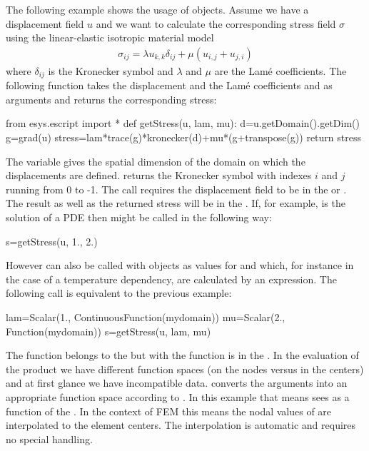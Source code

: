 The following example shows the usage of \Data objects. Assume we have a
displacement field $u$ and we want to calculate the corresponding stress field
$\sigma$ using the linear-elastic isotropic material model
\begin{eqnarray}\label{eq: linear elastic stress}
\sigma_{ij}=\lambda u_{k,k} \delta_{ij} + \mu ( u_{i,j} + u_{j,i})
\end{eqnarray}
where $\delta_{ij}$ is the Kronecker symbol and
$\lambda$ and $\mu$ are the Lam\'e coefficients. The following function
takes the displacement  and the Lam\'e coefficients  and 
as arguments and returns the corresponding stress:
\begin{python}
  from esys.escript import *
  def getStress(u, lam, mu):
    d=u.getDomain().getDim()
    g=grad(u)
    stress=lam*trace(g)*kronecker(d)+mu*(g+transpose(g))
    return stress
\end{python}
The variable  gives the spatial dimension of the domain on which the
displacements are defined.
 returns the Kronecker symbol with indexes $i$ and $j$ running
from 0 to -1.
The call  requires the displacement field  to be in
the  or \ContinuousFunction.
The result  as well as the returned stress will be in the \Function.
If, for example,  is the solution of a PDE then  might
be called in the following way:
\begin{python}
  s=getStress(u, 1., 2.)
\end{python}
However  can also be called with \Data objects as values for
 and  which, for instance in the case of a temperature
dependency, are calculated by an expression.
The following call is equivalent to the previous example:
\begin{python}
  lam=Scalar(1., ContinuousFunction(mydomain))
  mu=Scalar(2., Function(mydomain))
  s=getStress(u, lam, mu)
\end{python}
%
The function  belongs to the \ContinuousFunction but with  the
function  is in the \Function.
In the evaluation of the product  we have different function
spaces (on the nodes versus in the centers) and at first glance we have incompatible data.
\escript converts the arguments into an appropriate function space according
to .
In this example that means \escript sees  as a function of the \Function.
In the context of FEM this means the nodal values of  are
interpolated to the element centers.
The interpolation is automatic and requires no special handling.

